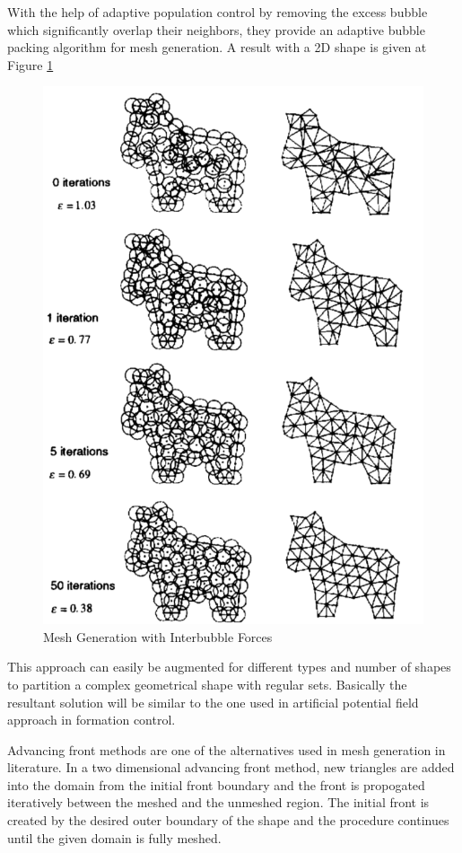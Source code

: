 With the help of adaptive population control by removing the excess bubble which significantly overlap their neighbors, they provide an adaptive bubble packing algorithm for mesh generation. A result with a 2D shape is given at Figure \ref{mesh_genearation_ref}


\begin{figure}[H]
	\caption{Mesh Generation with Interbubble Forces \cite{27}} \label{mesh_genearation_ref}
	\centering
	\includegraphics[scale = 0.4]{interbubble2}
\end{figure}

This approach can easily be augmented for different types and number of shapes to partition a complex geometrical shape with regular sets. Basically the resultant solution will be similar to the one used in artificial potential field approach in formation control. 

Advancing front methods are one of the alternatives used in mesh generation in literature.  In a two dimensional advancing front method, new triangles are added into the domain from the initial front boundary and the front is propogated iteratively between the meshed and the unmeshed region. The initial front is created by the desired outer boundary of the shape and the procedure continues until the given domain is fully meshed. 


